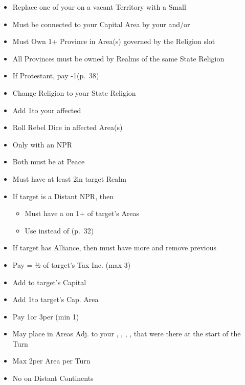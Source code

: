 \documentclass[10pt]{article}
\begin{document}
\begin{itemize}
	\item Replace one of your \claims on a vacant Territory with a Small \town
	\item Must be connected to your Capital Area by your \towns and/or \ships
\end{itemize}

\begin{itemize}
	\item Must Own 1+ Province in Area(s) governed by the Religion slot
	\item All Provinces must be owned by Realms of the same State Religion
	\item If Protestant, pay -1\adminpower (p.~38)
	\item Change Religion to your State Religion
	\item Add 1\unrest to your affected \towns
	\item Roll Rebel Dice in affected Area(s)
\end{itemize}

\begin{itemize}
	\item Only with an NPR
	\item Both must be at Peace
	\item Must have at least 2\influence in target Realm
	\item If target is a Distant NPR, then 
	\begin{itemize}
		\item Must have a \claim on 1+ of target's Areas
		\item Use \colonist instead of \influence (p.~32)
	\end{itemize}
	\item If target has Alliance, then must have more \influence and remove previous \alliance
	\item Pay \diplopower = ½ of target's Tax Inc. (max 3)
	\item Add \alliance to target's Capital
	\item Add 1\influence to target's Cap. Area
\end{itemize}

\begin{itemize}
	\item Pay 1\diplopower or 3\ducats per \influence (min 1\diplopower)
	\item May place \influence in Areas Adj. to your \towns, \vassals, \alliances, \marriages, \influence that were there at the start of the Turn
	\item Max 2\influence per Area per Turn
	\item No \influence on Distant Continents
\end{itemize}
\end{document}
